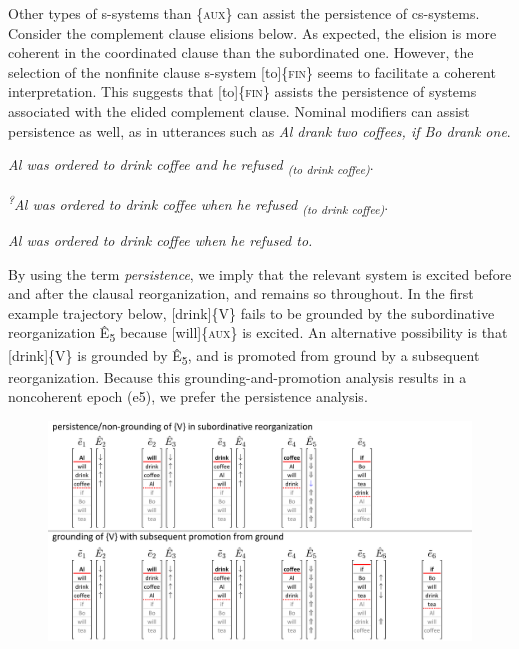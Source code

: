   Other types of s-systems than \{\textsc{aux}\} can assist the persistence of cs-systems. Consider the complement clause elisions below. As expected, the elision is more coherent in the coordinated clause than the subordinated one. However, the selection of the nonfinite clause s-system [to]\{\textsc{fin}\} seems to facilitate a coherent interpretation. This suggests that [to]\{\textsc{fin}\} assists the persistence of systems associated with the elided complement clause. Nominal modifiers can assist persistence as well, as in utterances such as \textit{Al drank two coffees, if Bo drank one}.

\textit{Al was ordered to drink coffee and he refused \textsubscript{(to drink coffee)}}.

\textit{\textsuperscript{?}}\textit{Al was ordered to drink coffee when he refused \textsubscript{(to drink coffee)}}.

\textit{Al was ordered to drink coffee when he refused to.}

  By using the term \textit{persistence}, we imply that the relevant system is excited before and after the clausal reorganization, and remains so throughout. In the first example trajectory below, [drink]\{V\} fails to be grounded by the subordinative reorganization Ê\textsubscript{5} because [will]\{\textsc{aux}\} is excited. An alternative possibility is that [drink]\{V\} is grounded by Ê\textsubscript{5},\textsubscript{} and is promoted from ground by a subsequent reorganization. Because this grounding-and-promotion analysis results in a noncoherent epoch (e5), we prefer the persistence analysis.

  
\begin{figure}
\includegraphics[width=\textwidth]{figures/Tilsen-img149.png}
\caption{\missingcaption}
\label{fig:}
\end{figure}
 

